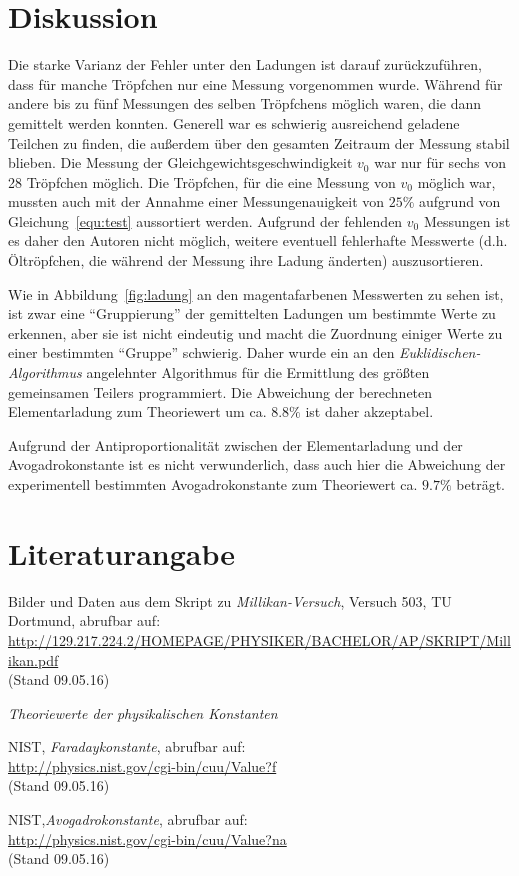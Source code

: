\section{Diskussion}
\label{sec:Diskussion}


Die starke Varianz der Fehler unter den Ladungen ist darauf zurückzuführen, dass für manche Tröpfchen nur eine Messung vorgenommen wurde. Während für andere bis zu fünf Messungen des selben Tröpfchens möglich waren, die dann gemittelt werden konnten. Generell war es schwierig ausreichend geladene Teilchen zu finden, die außerdem über den gesamten Zeitraum der Messung stabil blieben. Die Messung der Gleichgewichtsgeschwindigkeit $v_0$ war nur für sechs von 28 Tröpfchen möglich.
Die Tröpfchen, für die eine Messung von $v_0$ möglich war, mussten auch mit der Annahme einer Messungenauigkeit von $25\%$ aufgrund von Gleichung~\eqref{equ:test} aussortiert werden.
Aufgrund der fehlenden $v_0$ Messungen ist es daher den Autoren nicht möglich, weitere eventuell fehlerhafte Messwerte (d.h. Öltröpfchen, die während der Messung ihre Ladung änderten) auszusortieren.

Wie in Abbildung~\ref{fig:ladung} an den magentafarbenen Messwerten zu sehen ist, ist zwar eine ``Gruppierung'' der gemittelten Ladungen um bestimmte Werte zu erkennen, aber sie ist nicht eindeutig und macht die Zuordnung einiger Werte zu einer bestimmten ``Gruppe'' schwierig. Daher wurde ein an den \emph{Euklidischen-Algorithmus} angelehnter Algorithmus für die Ermittlung des größten gemeinsamen Teilers programmiert. Die Abweichung der berechneten Elementarladung zum Theoriewert um ca. $8.8\%$ ist daher akzeptabel.

Aufgrund der Antiproportionalität zwischen der Elementarladung und der Avogadrokonstante ist es nicht verwunderlich, dass auch hier die Abweichung der experimentell bestimmten Avogadrokonstante zum Theoriewert ca. $9.7\%$ beträgt.



\newpage
\section{Literaturangabe}
\label{sec:Literatur}

Bilder und Daten aus dem Skript zu \emph{Millikan-Versuch}, Versuch 503, TU Dortmund, abrufbar auf:\\
\url{http://129.217.224.2/HOMEPAGE/PHYSIKER/BACHELOR/AP/SKRIPT/Millikan.pdf}\\(Stand 09.05.16)\par


\emph{Theoriewerte der physikalischen Konstanten}

NIST, \emph{Faradaykonstante}, abrufbar auf:\\
\url{http://physics.nist.gov/cgi-bin/cuu/Value?f}\\(Stand 09.05.16)\par

NIST,\emph{Avogadrokonstante}, abrufbar auf:\\
\url{http://physics.nist.gov/cgi-bin/cuu/Value?na}\\(Stand 09.05.16)\par
